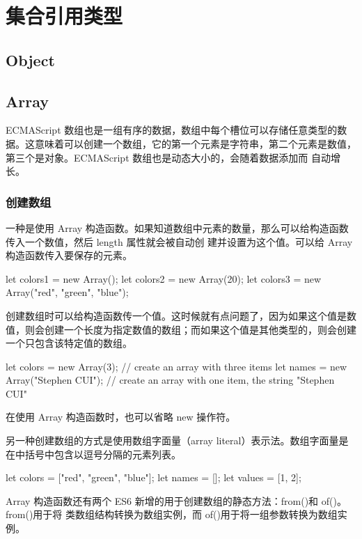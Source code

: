 \chapter{集合引用类型}
\section{Object}
\section{Array}
ECMAScript 数组也是一组有序的数据，数组中每个槽位可以存储任意类型的数据。这意味着可以创建一个数组，它的第一个元素是字符串，第二个元素是数值，第三个是对象。ECMAScript 数组也是动态大小的，会随着数据添加而
自动增长。
\subsection{创建数组}
一种是使用 Array 构造函数。如果知道数组中元素的数量，那么可以给构造函数传入一个数值，然后 length 属性就会被自动创
建并设置为这个值。可以给 Array 构造函数传入要保存的元素。
\begin{js}
    let colors1 = new Array();
    let colors2 = new Array(20);
    let colors3 = new Array("red", "green", "blue");
\end{js}

创建数组时可以给构造函数传一个值。这时候就有点问题了，因为如果这个值是数值，则会创建一个长度为指定数值的数组；而如果这个值是其他类型的，则会创建一个只包含该特定值的数组。

\begin{js}
    let colors = new Array(3);
    // create an array with three items
    let names = new Array("Stephen CUI");
    // create an array with one item, the string "Stephen CUI"
\end{js}
在使用 Array 构造函数时，也可以省略 new 操作符。

另一种创建数组的方式是使用数组字面量（array literal）表示法。数组字面量是在中括号中包含以逗号分隔的元素列表。

\begin{js}
    let colors = ["red", "green", "blue"];
    let names = [];
    let values = [1, 2];
\end{js}


Array 构造函数还有两个 ES6 新增的用于创建数组的静态方法：from()和 of()。from()用于将
类数组结构转换为数组实例，而 of()用于将一组参数转换为数组实例。

